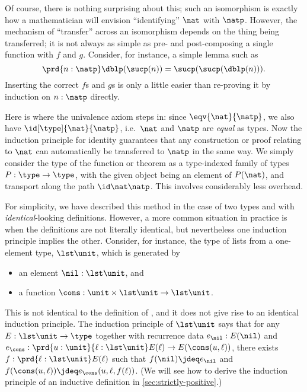 Of course, there is nothing surprising about this; such an isomorphism is exactly how a mathematician will envision ``identifying'' $\nat$ with $\natp$.
However, the mechanism of ``transfer'' across an isomorphism depends on the thing being transferred; it is not always as simple as pre- and post-composing a single function with $f$ and $g$.
Consider, for instance, a simple lemma such as
\[\prd{n : \natp} \dblp(\sucp(n))=\sucp(\sucp(\dblp(n))).\]
Inserting the correct $f$s and $g$s is only a little easier than re-proving it by induction on $n:\natp$ directly.
%

%
Here is where the univalence axiom steps in: since $\eqv{\nat}{\natp}$, we also have $\id[\type]{\nat}{\natp}$, i.e.\ $\nat$ and $\natp$ are
\emph{equal} as types.
Now the induction principle for identity guarantees that any construction or proof relating to $\nat$ can automatically be transferred to $\natp$ in the same way.
We simply consider the type of the function or theorem as a type-indexed family of types $P:\type\to\type$, with the given object being an element of $P(\nat)$, and transport along the path $\id \nat\natp$.
This involves considerably less overhead.

For simplicity, we have described this method in the case of two types \nat and \natp with \emph{identical}-looking definitions.
However, a more common situation in practice is when the definitions are not literally identical, but nevertheless one induction principle implies the other.
%
%
Consider, for instance, the type of lists from a one-element type, $\lst\unit$, which is generated by
\begin{itemize}
\item an element $\nil:\lst\unit$, and
\item a function $\cons:\unit \times \lst\unit \to\lst\unit$.
\end{itemize}
This is not identical to the definition of \nat, and it does not give rise to an identical induction principle.
The induction principle of $\lst\unit$ says that for any $E:\lst\unit\to\type$ together with recurrence data $e_\nil:E(\nil)$ and $e_\cons : \prd{u:\unit}{\ell:\lst\unit} E(\ell) \to E(\cons(u,\ell))$, there exists $f:\prd{\ell:\lst\unit} E(\ell)$ such that $f(\nil)\jdeq e_\nil$ and $f(\cons(u,\ell))\jdeq e_\cons(u,\ell,f(\ell))$.
(We will see how to derive the induction principle of an inductive definition in \cref{sec:strictly-positive}.)

